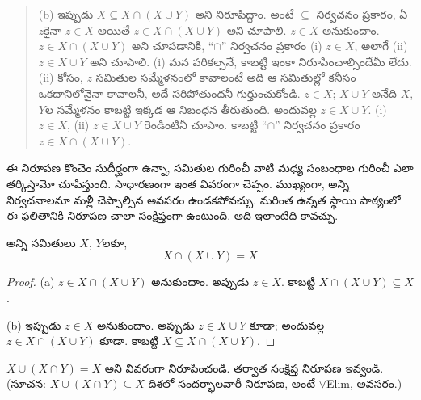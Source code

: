 \documentclass[../../../include/open-logic-section]{subfiles}
\begin{document}
\begin{explain}
\begin{quote}
(b) ఇప్పుడు $X \subseteq X \cap (X \cup Y)$ అని నిరూపిద్దాం. అంటే $\subseteq$ నిర్వచనం ప్రకారం, ఏ~$z$కైనా $z \in X$ అయితే $z \in X \cap (X \cup Y)$ అని చూపాలి. $z \in X$ అనుకుందాం. $z \in X \cap (X \cup Y)$ అని చూపడానికి, “$\cap$” నిర్వచనం ప్రకారం (i) $z \in X$, అలాగే (ii) $z \in X \cup Y$ అని చూపాలి. (i) మన పరికల్పనే, కాబట్టి ఇంకా నిరూపించాల్సిందేమీ లేదు. (ii) కోసం, $z$ సమితుల సమ్మేళనంలో  కావాలంటే అది ఆ సమితుల్లో కనీసం ఒకదానిలోనైనా  కావాలనీ, అదే సరిపోతుందనీ గుర్తుంచుకోండి. $z \in X$; $X \cup Y$ అనేది $X$, $Y$ల సమ్మేళనం కాబట్టి ఇక్కడ ఆ నిబంధన తీరుతుంది. అందువల్ల $z \in X \cup Y$. (i) $z \in X$, (ii) $z \in X \cup Y$ రెండింటినీ చూపాం. కాబట్టి “$\cap$” నిర్వచనం ప్రకారం $z \in X \cap (X \cup Y)$.
\end{quote}

ఈ నిరూపణ కొంచెం సుదీర్ఘంగా ఉన్నా, సమితుల గురించీ వాటి మధ్య సంబంధాల గురించీ ఎలా తర్కిస్తామో చూపిస్తుంది. సాధారణంగా ఇంత వివరంగా చెప్పం. ముఖ్యంగా, అన్ని నిర్వచనాలనూ మళ్లీ చెప్పాల్సిన అవసరం ఉండకపోవచ్చు. మరింత ఉన్నత స్థాయి పాఠ్యంలో ఈ ఫలితానికి నిరూపణ చాలా సంక్షిప్తంగా ఉంటుంది. అది ఇలాంటిది కావచ్చు.
\end{explain}

\begin{prop}[శోషణ]
అన్ని సమితులు $X$, $Y$లకూ,
\[
X \cap (X \cup Y) = X
\]
\end{prop}

\begin{proof}
(a) $z \in X \cap (X \cup Y)$ అనుకుందాం. అప్పుడు $z \in X$. కాబట్టి $X \cap (X \cup Y) \subseteq X$.

(b) ఇప్పుడు $z \in X$ అనుకుందాం. అప్పుడు $z \in X \cup Y$ కూడా; అందువల్ల $z \in X \cap (X \cup Y)$ కూడా. కాబట్టి $X \subseteq X \cap (X \cup Y)$.
\end{proof}

\begin{prob}
$X \cup (X \cap Y) = X$ అని వివరంగా నిరూపించండి. తర్వాత సంక్షిప్త నిరూపణ ఇవ్వండి. (సూచన: $X \cup (X \cap Y) \subseteq X$ దిశలో సందర్భాలవారీ నిరూపణ, అంటే $\lor$Elim, అవసరం.)
\end{prob}
\end{document}
